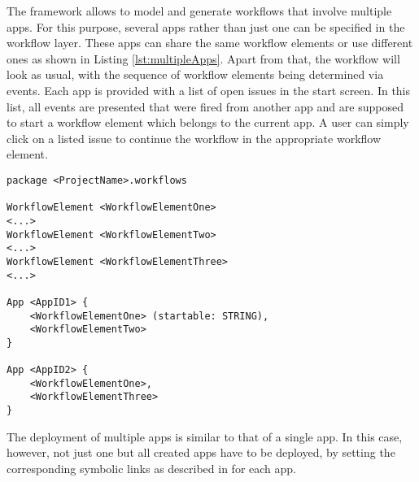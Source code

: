
The \MD framework allows to model and generate workflows that involve multiple apps. For this purpose, several apps rather than just one can be specified in the workflow layer. These apps can share the same workflow elements or use different ones as shown in Listing \ref{lst:multipleApps}. Apart from that, the workflow will look as usual, with the sequence of workflow elements being determined via events. Each app is provided with a list of open issues in the start screen. In this list, all events are presented that were fired from another app and are supposed to start a workflow element which belongs to the current app. A user can simply click on a listed issue to continue the workflow in the appropriate workflow element.

\begin{lstlisting}[language=MD2, label=lst:multipleApps, caption=Workflow definition for multiple apps]
package <ProjectName>.workflows

WorkflowElement <WorkflowElementOne>
<...>
WorkflowElement <WorkflowElementTwo>
<...>
WorkflowElement <WorkflowElementThree>
<...>

App <AppID1> {
	<WorkflowElementOne> (startable: STRING),
	<WorkflowElementTwo>
}

App <AppID2> {
	<WorkflowElementOne>,
	<WorkflowElementThree>
}
\end{lstlisting}

The deployment of multiple apps is similar to that of a single app. In this case, however, not just one but all created apps have to be deployed, \eg by setting the corresponding symbolic links as described in   for each app.
